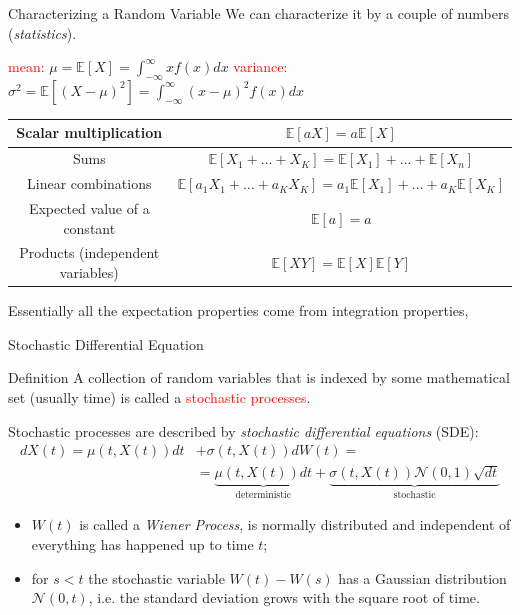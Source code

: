 \documentclass{beamer}
\begin{document}
\begin{frame}{Characterizing a Random Variable}
	We can characterize it by a couple of numbers (\emph{statistics}).
	\small{
		\begin{center}
			\textcolor{red}{mean:} $\boxed{\mu = \mathbb{E}[X] = \int_{-\infty}^{\infty} xf(x)dx}$\quad
			\textcolor{red}{variance:}  
			$\boxed{\sigma^2 = \mathbb{E}[(X-\mu)^2] =\int_{-\infty}^{\infty} (x-\mu)^2f(x)dx}$
	\end{center}
}
	\renewcommand{\arraystretch}{1.4}
{\tiny {\tiny }}{
	\begin{table}[bt]
		\begin{tabular}{|c|c|} \hline
			Scalar multiplication & $\mathbb{E}[aX] = a\mathbb{E}[X]$ \\ \hline
			Sums & $\mathbb{E}[X_1+\ldots +X_K] =  \mathbb{E}[X_1] +\ldots + \mathbb{E}[X_n]$ \\ \hline
			Linear combinations & $\mathbb{E}[a_1X_1+\ldots +a_KX_K] =  a_1\mathbb{E}[X_1] +\ldots + a_K\mathbb{E}[X_K]$ \\ \hline
			Expected value of a constant & $\mathbb{E}[a] = a$ \\ \hline
			Products (independent variables) & $\mathbb{E}[XY] = \mathbb{E}[X] \mathbb{E}[Y]$ \\ \hline
		\end{tabular}
	\end{table}
}
Essentially all the expectation properties come from integration properties,
\end{frame}

\begin{frame}{Stochastic Differential Equation}
\begin{block}{Definition}
A collection of random variables that is indexed by some mathematical set (usually time) is called a \textcolor{red}{stochastic processes}.
\end{block}
Stochastic processes are described by \emph{stochastic differential equations} (SDE):	
	\begin{equation}
		\begin{aligned}
			dX(t) = \mu(t,X(t)) dt &+ \sigma(t,X(t)) dW(t) =\\  & =\underbrace{\mu(t,X(t))dt}_{\textrm{deterministic}} + \underbrace{\sigma(t,X(t)) \mathcal{N}(0,1)\sqrt{dt}}_{\textrm{stochastic}}
		\end{aligned}
	\label{eq:sde}
	\end{equation}
	
\begin{itemize}
\item $W(t)$ is called a \emph{Wiener Process}, is normally distributed and independent of everything has happened up to time $t$;
\item for $s< t$ the stochastic variable $W(t)-W(s)$ has a Gaussian distribution $\mathcal{N}(0, t)$, i.e. the standard deviation grows with the square root of time.
\end{itemize}  
\end{frame}
\end{document}
